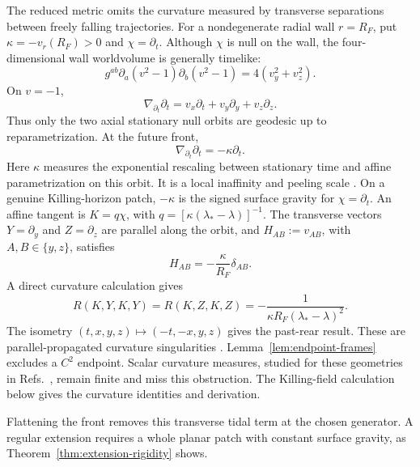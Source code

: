 The reduced metric omits the curvature measured by transverse separations
between freely falling trajectories.  For a nondegenerate radial wall
\(r=R_F\), put
\(\kappa=-v_r(R_F)>0\) and
\(\chi=\partial_t\).  Although \(\chi\) is null on the wall, the
four-dimensional wall worldvolume is generally timelike:
\begin{equation}
  g^{ab}\partial_a(v^2-1)\partial_b(v^2-1)=4(v_y^2+v_z^2).
  \label{background:eq:wall-normal-norm}
\end{equation}
On \(v=-1\),
\begin{equation}
  \nabla_{\partial_t}\partial_t
    =v_x\partial_t+v_y\partial_y+v_z\partial_z .
  \label{background:eq:not-whole-sphere}
\end{equation}
Thus only the two axial stationary null orbits are geodesic up to
reparametrization.  At the future front,
\begin{equation}
  \nabla_{\partial_t}\partial_t=-\kappa\partial_t .
  \label{background:eq:nonaffine}
\end{equation}
Here \(\kappa\) measures the exponential rescaling between stationary time
and affine parametrization on this orbit.  It is a local inaffinity and
peeling scale \cite{CroppLiberatiVisser2013}.  On a genuine Killing-horizon
patch, \(-\kappa\) is the signed surface gravity for \(\chi=\partial_t\).
An affine tangent is \(K=q\chi\), with
\(q=[\kappa(\lambda_*-\lambda)]^{-1}\).  The transverse vectors
\(Y=\partial_y\) and \(Z=\partial_z\) are parallel along the orbit, and
\(H_{AB}:=v_{AB}\), with \(A,B\in\{y,z\}\), satisfies
\begin{equation}
  H_{AB}=-\frac{\kappa}{R_F}\delta_{AB}.
  \label{background:eq:radial-hessian}
\end{equation}
A direct curvature calculation gives
\begin{equation}
  R(K,Y,K,Y)=R(K,Z,K,Z)
  =-\frac{1}{\kappa R_F(\lambda_*-\lambda)^2}.
  \label{background:eq:main-blowup}
\end{equation}
The isometry \((t,x,y,z)\mapsto(-t,-x,y,z)\) gives the past-rear result.
These are parallel-propagated curvature singularities
\cite{EllisSchmidt1977}.  Lemma~\ref{lem:endpoint-frames} excludes a \(C^2\)
endpoint.  Scalar curvature measures, studied for these geometries in
Refs.~\cite{MattinglyEtAl2021,Rodal2023}, remain finite and miss this
obstruction.  The Killing-field calculation below gives the curvature
identities and derivation.

Flattening the front removes this transverse tidal term at the chosen
generator.  A regular extension requires a whole planar patch with constant
surface gravity, as Theorem~\ref{thm:extension-rigidity} shows.

